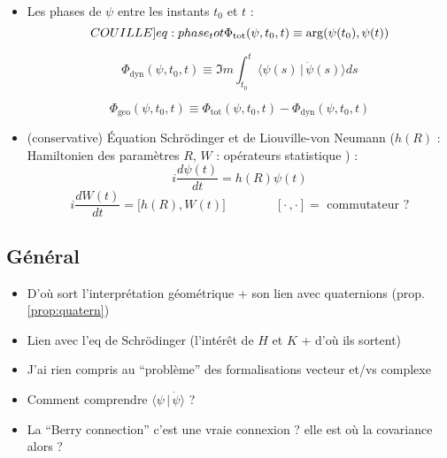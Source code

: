 \documentclass[hidelinks, french, oneside]{article}
\newcommand{\phaset}{\Phi_{\text{tot}}}
\newcommand{\phased}{\Phi_{\text{dyn}}}
\newcommand{\phaseg}{\Phi_{\text{geo}}}
\theoremstyle{enonce}
\theoremstyle{special}
\theoremstyle{rq}
\theoremstyle{exo}
\theoremstyle{demo}
\begin{document}
\begin{itemize}
	\item Les phases de $\psi$ entre les instants $t_0$ et $t$ :
	\begin{equation}\label[COUILLE]{eq:phase_tot}
		\phaset(\psi, t_0, t) \equiv \arg(\psi(t_0), \psi(t))
	\end{equation}
	
	\begin{equation}\label{eq:phase_dyn}
		\phased(\psi,t_0,t) \equiv \Im m \int_{t_0}^t\big\langle \psi(s) \,|\, \dot{\psi}(s) \big\rangle ds
	\end{equation}
	
	\begin{equation}\label{eq:phase_geo}
		\phaseg(\psi, t_0, t) \equiv  \phaset(\psi, t_0, t) - \phased(\psi,t_0,t)
	\end{equation}
	
	\item (conservative) Équation Schrödinger et de Liouville-von Neumann ($h(R)$ : Hamiltonien des paramètres $R$, $W$ : opérateurs statistique ) \cite[p.6]{bohm_geometric_2003} :
	\begin{equation}\label{eq:schrodinger}
		i\frac{d \psi(t)}{dt} = h(R)\psi(t)
	\end{equation}
	\begin{equation}\label{eq:liouville-neumann}
		i\frac{d W(t)}{dt} = \big[h(R),W(t)\big] \qquad\qquad [\cdot\,,\cdot]=\text{ commutateur ?}
	\end{equation}
\end{itemize}


\subsection{Général}

\begin{itemize}
	\item D'où sort l'interprétation géométrique + son lien avec quaternions (prop. \ref{prop:quatern})
	\item Lien avec l'eq de Schrödinger (l'intérêt de $H$ et $K$ + d'où ils sortent)
	\item J'ai rien compris au ``problème'' des formalisations vecteur et/vs complexe
	\item Comment comprendre $\big\langle \psi\, |\, \dot{\psi} \big\rangle$ ?
	
	\item La ``Berry connection'' c'est une vraie connexion ? elle est où la covariance alors ?
\end{itemize}
\end{document}

